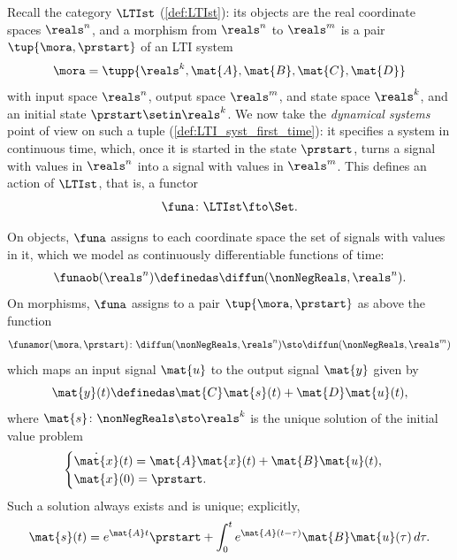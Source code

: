 \begin{example}
    \label{exa:lti-action-signals}
    Recall the category $\LTIst$ (\cref{def:LTIst}): its objects are the real coordinate spaces $\reals^n$, and a morphism from $\reals^n$ to $\reals^m$ is a pair $\tup{\mora, \prstart}$ of an LTI system
    \begin{equation}
        \mora = \tupp{\reals^k, \mat{A}, \mat{B}, \mat{C}, \mat{D}}
    \end{equation}
    with input space $\reals^n$, output space $\reals^m$, and state space $\reals^k$, and an initial state $\prstart \setin \reals^k$.
    We now take the \emph{dynamical systems} point of view on such a tuple (\cref{def:LTI_syst_first_time}): it specifies a system in continuous time, which, once it is started in the state $\prstart$, turns a signal with values in $\reals^n$ into a signal with values in $\reals^m$.
    This defines an action of $\LTIst$, that is, a functor
    \begin{equation}
        \funa \colon \LTIst \fto \Set.
    \end{equation}

    On objects, $\funa$ assigns to each coordinate space the set of signals with values in it, which we model as continuously differentiable functions of time:
    \begin{equation}
        \funaob(\reals^n) \definedas \diffun(\nonNegReals, \reals^n).
    \end{equation}
    On morphisms, $\funa$ assigns to a pair $\tup{\mora, \prstart}$ as above the function
    \begin{equation}
        \funamor(\mora, \prstart) \colon \diffun(\nonNegReals, \reals^n) \sto \diffun(\nonNegReals, \reals^m)
    \end{equation}
    which maps an input signal $\mat{u}$ to the output signal $\mat{y}$ given by
    \begin{equation}
        \label{eq:lti-action-signals-output}
        \mat{y}(t) \definedas \mat{C}\mat{s}(t) + \mat{D}\mat{u}(t),
    \end{equation}
    where $\mat{s} \colon \nonNegReals \sto \reals^k$ is the unique solution of the initial value problem
    \begin{equation}
        \label{eq:lti-action-signals-ivp}
        \begin{cases}
            \dot{\mat{x}}(t) = \mat{A}\mat{x}(t) + \mat{B}\mat{u}(t), \\
            \mat{x}(0) = \prstart.
        \end{cases}
    \end{equation}
    Such a solution always exists and is unique; explicitly,
    \begin{equation}
        \mat{s}(t) = e^{\mat{A} t} \prstart + \int_{0}^{t} e^{\mat{A} (t - \tau)}\mat{B}\mat{u}(\tau) \, d\tau.
    \end{equation}


\end{example}
